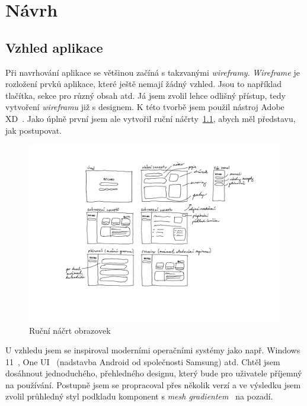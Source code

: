 
\chapter{Návrh}

\section{Vzhled aplikace}

Při navrhování aplikace se většinou začíná s takzvanými \emph{wireframy}. \emph{Wireframe} je rozložení prvků aplikace, které ještě
nemají žádný vzhled. Jsou to například tlačítka, sekce pro různý obsah atd. Já jsem zvolil lehce odlišný přístup, tedy
vytvoření \emph{wireframu} již s designem. K této tvorbě jsem použil nástroj Adobe XD~\cite{AdobeXD}. Jako úplně první jsem ale vytvořil
ruční náčrty~\ref{picture:recipeo:hand-drawn-design}, abych měl představu, jak postupovat.

\begin{figure}[H]
    \includegraphics[width=\textwidth]{pdf/navrh-rucni}
    \caption{Ruční náčrt obrazovek} \label{picture:recipeo:hand-drawn-design}
\end{figure}

U vzhledu jsem se inspiroval moderními operačními systémy jako např. Windows 11~\cite{Windows11}, One UI~\cite{OneUI}
(nadstavba Android od společnosti Samsung) atd.
Chtěl jsem dosáhnout jednoduchého, přehledného designu, který bude pro uživatele příjemný na používání. Postupně jsem se
propracoval přes několik verzí a ve výsledku jsem zvolil průhledný styl podkladu komponent s \emph{mesh gradientem}~\cite{MeshGradients} na pozadí.

